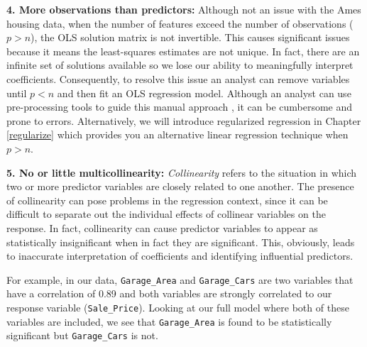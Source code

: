 \documentclass[]{book}
\newenvironment{Shaded}{\begin{snugshade}}{\end{snugshade}}
\newcommand{\CommentTok}[1]{\textcolor[rgb]{0.56,0.35,0.01}{\textit{#1}}}
\newcommand{\KeywordTok}[1]{\textcolor[rgb]{0.13,0.29,0.53}{\textbf{#1}}}
\newcommand{\NormalTok}[1]{#1}
\newcommand{\OperatorTok}[1]{\textcolor[rgb]{0.81,0.36,0.00}{\textbf{#1}}}
\newcommand{\StringTok}[1]{\textcolor[rgb]{0.31,0.60,0.02}{#1}}
\theoremstyle{definition}
\theoremstyle{definition}
\theoremstyle{definition}
\theoremstyle{remark}
\begin{document}
\textbf{4. More observations than predictors:} Although not an issue
with the Ames housing data, when the number of features exceed the
number of observations (\(p > n\)), the OLS solution matrix is not
invertible. This causes significant issues because it means the
least-squares estimates are not unique. In fact, there are an infinite
set of solutions available so we lose our ability to meaningfully
interpret coefficients. Consequently, to resolve this issue an analyst
can remove variables until \(p < n\) and then fit an OLS regression
model. Although an analyst can use pre-processing tools to guide this
manual approach \citep[43-47]{apm}, it can be cumbersome and prone to
errors. Alternatively, we will introduce regularized regression in
Chapter \ref{regularize} which provides you an alternative linear
regression technique when \(p > n\).

\textbf{5. No or little multicollinearity:} \emph{Collinearity} refers
to the situation in which two or more predictor variables are closely
related to one another. The presence of collinearity can pose problems
in the regression context, since it can be difficult to separate out the
individual effects of collinear variables on the response. In fact,
collinearity can cause predictor variables to appear as statistically
insignificant when in fact they are significant. This, obviously, leads
to inaccurate interpretation of coefficients and identifying influential
predictors.

For example, in our data, \texttt{Garage\_Area} and
\texttt{Garage\_Cars} are two variables that have a correlation of 0.89
and both variables are strongly correlated to our response variable
(\texttt{Sale\_Price}). Looking at our full model where both of these
variables are included, we see that \texttt{Garage\_Area} is found to be
statistically significant but \texttt{Garage\_Cars} is not.

\begin{Shaded}
\end{Shaded}
\end{document}
